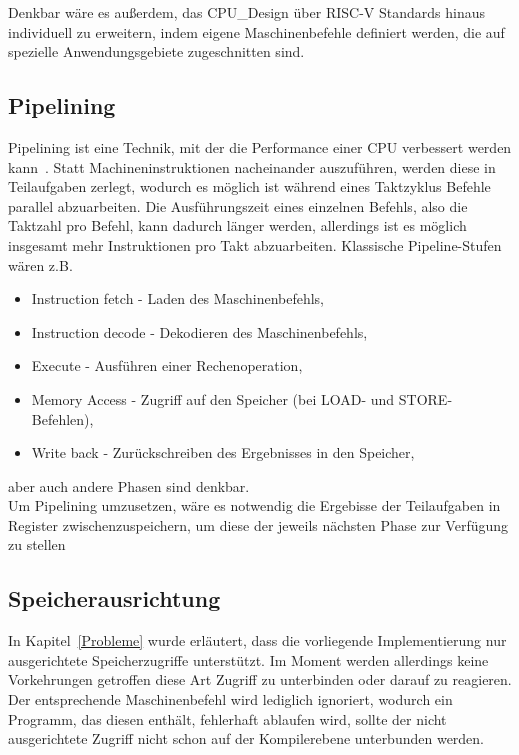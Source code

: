 Denkbar wäre es außerdem, das CPU_Design über RISC-V Standards hinaus individuell zu erweitern, indem eigene Maschinenbefehle definiert werden, die auf spezielle Anwendungsgebiete zugeschnitten sind.

\subsection{Pipelining}

Pipelining ist eine Technik, mit der die Performance einer CPU verbessert werden kann~\cite[A.1]{Hennessy}.
Statt Machineninstruktionen nacheinander auszuführen, werden diese in Teilaufgaben zerlegt, wodurch es möglich ist während eines Taktzyklus Befehle parallel abzuarbeiten.
Die Ausführungszeit eines einzelnen Befehls, also die Taktzahl pro Befehl, kann dadurch länger werden, allerdings ist es möglich insgesamt mehr Instruktionen pro Takt abzuarbeiten.
Klassische Pipeline-Stufen wären z.B.
\begin{itemize}
    \item Instruction fetch - Laden des Maschinenbefehls,
    \item Instruction decode - Dekodieren des Maschinenbefehls,
    \item Execute - Ausführen einer Rechenoperation,
    \item Memory Access - Zugriff auf den Speicher (bei LOAD- und STORE-Befehlen),
    \item Write back - Zurückschreiben des Ergebnisses in den Speicher,
\end{itemize}
aber auch andere Phasen sind denkbar.\\
Um Pipelining umzusetzen, wäre es notwendig die Ergebisse der Teilaufgaben in Register zwischenzuspeichern, um diese der jeweils nächsten Phase zur Verfügung zu stellen





\subsection{Speicherausrichtung}
In Kapitel~\ref{Probleme} wurde erläutert, dass die vorliegende Implementierung nur ausgerichtete Speicherzugriffe unterstützt.
Im Moment werden allerdings keine Vorkehrungen getroffen diese Art Zugriff zu unterbinden oder darauf zu reagieren.
Der entsprechende Maschinenbefehl wird lediglich ignoriert, wodurch ein Programm, das diesen enthält, fehlerhaft ablaufen wird, sollte der nicht ausgerichtete Zugriff nicht schon auf der Kompilerebene unterbunden werden.

